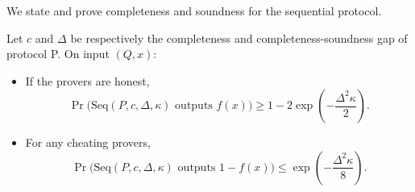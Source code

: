 \noindent We state and prove completeness and soundness for the sequential protocol.

\begin{theorem}
Let $c$ and $\Delta$ be respectively the completeness and completeness-soundness gap of protocol P. On input $(Q,x)$:
\begin{itemize}
\item If the provers are honest, $$ \Pr\big(\mbox{Seq}(P, c, \Delta, \kappa) \mbox{  outputs } f(x)\big) \geq 1 - 2\exp \left(-\frac{\Delta^2\kappa}{2}\right) .$$ 
\item For any cheating provers, $$\Pr\big(\mbox{Seq}(P, c, \Delta, \kappa) \mbox{  outputs } 1-f(x)\big) \leq \exp \left(-\frac{\Delta^2\kappa}{8}\right) .$$
\end{itemize}

\end{theorem}

